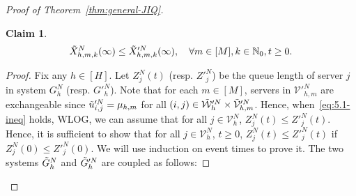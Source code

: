 \documentclass[11pt, reqno]{article}
\newtheorem{claim}[theorem]{Claim}
\numberwithin{equation}{section}
\numberwithin{theorem}{section}
\let\plainqed\qedsymbol
\newcommand{\claimqed}{$\lrcorner$}
\newenvironment{claimproof}{\begin{proof}\renewcommand{\qedsymbol}{\claimqed}}{\end{proof}\renewcommand{\qedsymbol}{\plainqed}}
\newcommand{\N}{\mathbb{N}}                 %
\begin{document}
\begin{proof}[Proof of Theorem~\ref{thm:general-JIQ}]
\begin{claim}
\begin{equation*}
    \Tilde{X}^N_{h,m,k}(\infty)\leq \Tilde{X}'^N_{h,m,k}(\infty), \quad \forall m\in[M],k\in\N_0,t\geq 0.
\end{equation*}
\end{claim}
\begin{claimproof}
Fix any $h\in[H]$. Let $Z^N_j(t)$ (resp. $Z'^N_j$) be the queue length of server $j$ in system $G^N_h$ (resp. $G'^N_h$).
Note that for each $m\in[M]$, servers in $\mathcal{V}'^N_{h,m}$ are exchangeable since $\Tilde{u}'^N_{i,j}=\mu_{h,m}$ for all $(i,j)\in\Tilde{\mathcal{W}}'^N_h\times\Tilde{\mathcal{V}}'^N_{h,m}$. Hence, when~\eqref{eq:5.1-ineq} holds, WLOG, we can assume that for all $j\in\mathcal{V}^N_h$,  $Z^N_j(t)\leq Z'^N_j(t)$. Hence, it is sufficient to show that for all $j\in\mathcal{V}^N_h$, $t\geq 0$,  $Z^N_j(t)\leq Z'^N_j(t)$ if $Z^N_j(0)\leq Z'^N_j(0)$.
We will use induction on event times to prove it.
The two systems $\Tilde{G}^N_h$ and $\Tilde{G}'^N_h$ are coupled as follows:
\vspace{.1cm}


\end{claimproof}
\end{proof}
\end{document}
